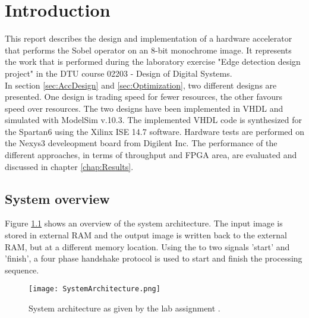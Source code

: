 \chapter{Introduction}
\label{chap:Intro}
This report describes the design and implementation of a hardware accelerator that performs the Sobel operator on an 8-bit monochrome image. It represents the work that is performed during the laboratory exercise "Edge detection design project" \cite{Sparsoe2014} in the DTU course 02203 - Design of Digital Systems.\\
In section \ref{sec:AccDesign} and \ref{sec:Optimization}, two different designs are presented. One design is trading speed for fewer resources, the other favours speed over resources. The two designs have been implemented in VHDL and simulated with ModelSim v.10.3. The implemented VHDL code is synthesized for the Spartan6 using the Xilinx ISE 14.7 software. Hardware tests are performed on the Nexys3 develeopment board from Digilent Inc. The performance of the different approaches, in terms of throughput and FPGA area, are evaluated and discussed in chapter \ref{chap:Results}.

\section{System overview}
\label{sec:SysOverview}
Figure \ref{fig:SysArch} shows an overview of the system architecture. The input image is stored in external RAM and the output image is written back to the external RAM, but at a different memory location. Using the to two signals 'start' and 'finish', a four phase handshake protocol is used to start and finish the processing sequence.

\begin{figure}[H]
	\centering
	\texttt{[image: SystemArchitecture.png]}
	\caption{System architecture as given by the lab assignment \cite{Sparsoe2014}.}
	\label{fig:SysArch}
\end{figure}
